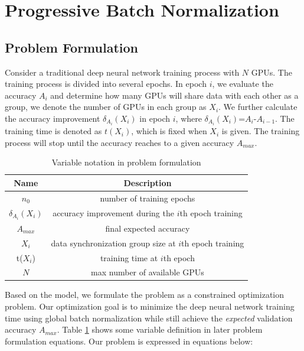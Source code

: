 \documentclass{llncs}
\begin{document}
\section{Progressive Batch Normalization}




\subsection{Problem Formulation}


Consider a traditional deep neural network training process with $N$ GPUs. The training process is divided into several epochs.
In epoch $i$, we evaluate the accuracy $A_i$ and determine how many GPUs will share data with each other as a group, we denote the number of GPUs in each group as $X_i$. 
We further calculate the accuracy improvement $\delta_{A_i}(X_i)$ in epoch $i$, where $\delta_{A_i}(X_i)$=$A_i$-$A_{i-1}$.
The training time is denoted as $t(X_i)$, which is fixed when $X_i$ is given. The training process will stop until the accuracy reaches to a given accuracy $A_{max}$.


\begin{table}[]
    \centering
    \begin{tabular}{|c|c|}
        \hline    Name & Description  \\
        \hline    $n_0$ & number of training epochs  \\
        \hline    $\delta_{A_i}(X_i)$ & accuracy improvement during the $i$th epoch training  \\
        \hline    $A_{max}$ & final expected accuracy \\
        \hline    $X_i$ & data synchronization group size at $i$th epoch training  \\
        \hline    t($X_i$) & training time at $i$th epoch \\
        \hline    $N$ & max number of available GPUs \\
        \hline
    \end{tabular}
    \newline
    \newline
    \caption{Variable notation in problem formulation}
    \label{tab:notation}
\end{table}


Based on the model, we formulate the problem as a constrained optimization problem. Our optimization goal is to minimize the deep neural network training time using global batch normalization while still achieve the \textit{expected} validation accuracy $A_{max}$. Table \ref{tab:notation} shows some variable definition in later problem formulation equations. Our problem is expressed in equations below:
\end{document}
